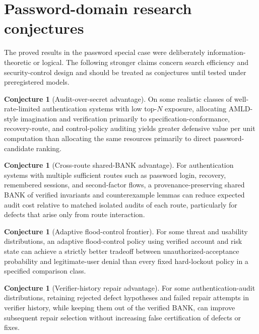 \documentclass[11pt,openany]{book}
\theoremstyle{definition}
\newtheorem{conjecture}[theorem]{Conjecture}
\theoremstyle{remark}
\begin{document}
\section{Password-domain research conjectures}
The proved results in the password special case were deliberately information-theoretic or logical. The following stronger claims concern search efficiency and security-control design and should be treated as conjectures until tested under preregistered models.

\begin{conjecture}[Audit-over-secret advantage]\label{conj:auditsecret}
On some realistic classes of well-rate-limited authentication systems with low top-$N$ exposure, allocating AMLD-style imagination and verification primarily to specification-conformance, recovery-route, and control-policy auditing yields greater defensive value per unit computation than allocating the same resources primarily to direct password-candidate ranking.
\end{conjecture}

\begin{conjecture}[Cross-route shared-BANK advantage]\label{conj:crossroute}
For authentication systems with multiple sufficient routes such as password login, recovery, remembered sessions, and second-factor flows, a provenance-preserving shared BANK of verified invariants and counterexample lemmas can reduce expected audit cost relative to matched isolated audits of each route, particularly for defects that arise only from route interaction.
\end{conjecture}

\begin{conjecture}[Adaptive flood-control frontier]\label{conj:floodfrontier}
For some threat and usability distributions, an adaptive flood-control policy using verified account and risk state can achieve a strictly better tradeoff between unauthorized-acceptance probability and legitimate-user denial than every fixed hard-lockout policy in a specified comparison class.
\end{conjecture}

\begin{conjecture}[Verifier-history repair advantage]\label{conj:authhistory}
For some authentication-audit distributions, retaining rejected defect hypotheses and failed repair attempts in verifier history, while keeping them out of the verified BANK, can improve subsequent repair selection without increasing false certification of defects or fixes.
\end{conjecture}
\end{document}
